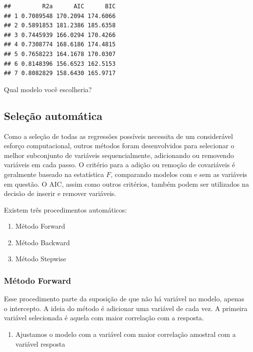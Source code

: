 \documentclass[
]{book}
\providecommand{\tightlist}{%
  \setlength{\itemsep}{0pt}\setlength{\parskip}{0pt}}
\begin{document}
\begin{verbatim}
##         R2a      AIC      BIC
## 1 0.7089548 170.2094 174.6066
## 2 0.5891853 181.2386 185.6358
## 3 0.7445939 166.0294 170.4266
## 4 0.7308774 168.6186 174.4815
## 5 0.7658223 164.1678 170.0307
## 6 0.8148396 156.6523 162.5153
## 7 0.8082829 158.6430 165.9717
\end{verbatim}

Qual modelo você escolheria?

\hypertarget{seleuxe7uxe3o-automuxe1tica}{%
\subsection{Seleção automática}\label{seleuxe7uxe3o-automuxe1tica}}

Como a seleção de todas as regressões possíveis necessita de um considerável esforço computacional, outros métodos foram desenvolvidos para selecionar o melhor subconjunto de variáveis sequencialmente, adicionando ou removendo variáveis em cada passo. O critério para a adição ou remoção de covariáveis é geralmente baseado na estatística \(F\), comparando modelos com e sem as variáveis em questão. O AIC, assim como outros critérios, também podem ser utilizados na decisão de inserir e remover variáveis.

Existem três procedimentos automáticos:

\begin{enumerate}
\def\labelenumi{(\arabic{enumi})}
\tightlist
\item
  Método Forward
\item
  Método Backward
\item
  Método Stepwise
\end{enumerate}

\hypertarget{muxe9todo-forward}{%
\subsubsection{Método Forward}\label{muxe9todo-forward}}

Esse procedimento parte da suposição de que não há variável no modelo, apenas o intercepto. A ideia do método é adicionar uma variável de cada vez. A primeira variável selecionada é aquela com maior correlação com a resposta.

\begin{enumerate}
\def\labelenumi{\arabic{enumi}.}
\tightlist
\item
  Ajustamos o modelo com a variável com maior correlação amostral com a variável resposta
\end{enumerate}
\end{document}

